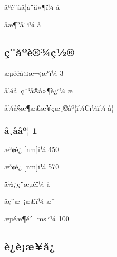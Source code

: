 \documentclass[UTF8,10pt,a4paper,fontset=fandol]{ctexart}
\newcommand{\fieldvalue}[1]{#1}
\begin{document}
\begin{center}
\begin{center}
\noindent
åºé¨åå­¦å¨ä»¶ï¼%
\fieldvalue{å¦}

\noindent
åæ¶²å¨ï¼%
\fieldvalue{å¦}

\subsection*{ç¨åºè®¾ç½®}

\noindent
æµééå¤æ¬¡æ°ï¼%
\fieldvalue{3}

\noindent
å¼å¯ç¨³å®å»¶è¿ï¼%
\fieldvalue{æ¯}

\noindent
å¼å§æ¶æ£æ¥çæ¸©åº¦ï¼\textdegree Cï¼ï¼%
\fieldvalue{å¦}

\subsubsection*{å¸ååº¦ 1}

\noindent
æ³¢é¿ [nm]ï¼%
\fieldvalue{450}

\noindent
æ³¢é¿ [nm]ï¼%
\fieldvalue{570}

\noindent
ä½¿ç¨æµéï¼%
\fieldvalue{å¦}

\noindent
åç¨æ ¡æ­£ï¼%
\fieldvalue{æ¯}

\noindent
æµéæ¶é´ [ms]ï¼%
\fieldvalue{100}

\subsection*{è¿è¡æ¥å¿}


\end{center}
\end{center}
\end{document}
